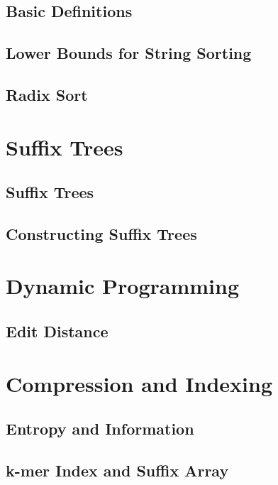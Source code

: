 \documentclass[nobib]{tufte-book}
\begin{document}
\chapter{Basic Definitions}


\chapter{Lower Bounds for String Sorting}


\chapter{Radix Sort}


\part{Suffix Trees}

\chapter{Suffix Trees}


\chapter{Constructing Suffix Trees}


\part{Dynamic Programming}

\chapter{Edit Distance}

\part{Compression and Indexing}

\chapter{Entropy and Information}

\chapter{k-mer Index and Suffix Array}

\end{document}
